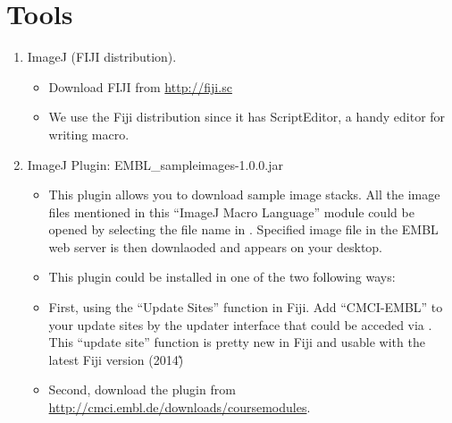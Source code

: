 \section{Tools}
\label{sec:tools}

\begin{enumerate}
  \item ImageJ (FIJI distribution).

\begin{itemize}
    \item Download FIJI from \url{http://fiji.sc}
    \item We use the Fiji distribution since it has ScriptEditor, a handy editor for writing macro. 
  
\end{itemize}
  \item ImageJ Plugin: EMBL\_sampleimages-1.0.0.jar

\begin{itemize}
     \item This plugin allows you to download sample image stacks. All the image files mentioned in this ``ImageJ Macro Language'' module could be opened by selecting the file name in . Specified image file in the EMBL web server is then downlaoded and appears on your desktop.
    \item This plugin could be installed in one of the two following ways:
    \item First, using the ``Update Sites'' function in Fiji. Add ``CMCI-EMBL'' to your update sites by the updater interface that could be acceded via . This ``update site'' function is pretty new in Fiji and usable with the latest Fiji version (2014\~)        
    \item Second, download the plugin from \url{http://cmci.embl.de/downloads/coursemodules}. 
  
\end{itemize}

\end{enumerate}
 
\newpage